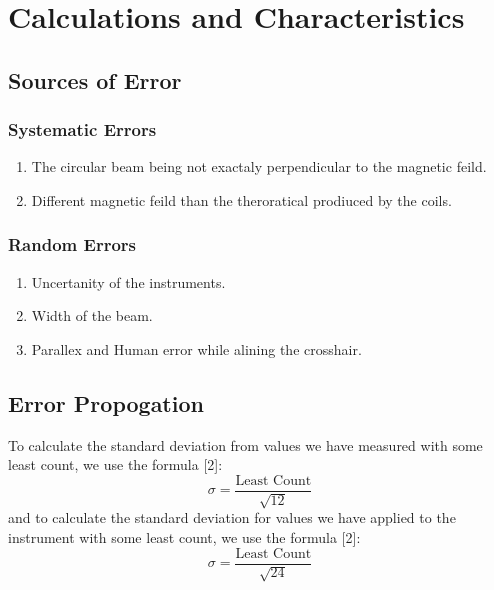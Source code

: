 \documentclass[%
sor,
 jor,
 amsmath,amssymb,
 reprint,
]{revtex4-2}
\begin{document}
\section{Calculations and Characteristics}
\subsection{Sources of Error}
\subsubsection{Systematic Errors}
\begin{enumerate}
	\item The circular beam being not exactaly perpendicular to the magnetic feild.
	\item Different magnetic feild than the theroratical prodiuced by the coils.
\end{enumerate}

\subsubsection{Random Errors}
\begin{enumerate}
	\item Uncertanity of the instruments.
	\item Width of the beam.
	\item Parallex and Human error while alining the crosshair.
\end{enumerate}
\subsection{Error Propogation}
To calculate the standard deviation from values we have measured with some least count, we use the formula [2]: 
\begin{equation}
\sigma = \frac{\text{Least Count}}{\sqrt{12}}
\end{equation}
and to calculate the standard deviation for values we have applied to the instrument with some least count, we use the formula [2]: 
\begin{equation}
\sigma = \frac{\text{Least Count}}{\sqrt{24}}
\end{equation}
\end{document}
